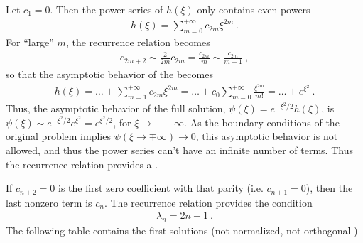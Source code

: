 \documentclass[letterpaper,10pt,english]{jupyterBook}
\begin{document}
\sphinxAtStartPar
{} Let \(c_1 = 0\). Then the power series of \(h(\xi)\) only contains even powers
\begin{equation*}
\begin{split}h(\xi) = \sum_{m=0}^{+\infty} c_{2m} \xi^{2m} \ .\end{split}
\end{equation*}
\sphinxAtStartPar
For “large” \(m\), the recurrence relation becomes
\begin{equation*}
\begin{split}c_{2m+2} \sim \frac{2}{2m} c_{2m} = \frac{c_{2m}}{m} \sim \frac{c_{2m}}{m+1} \ ,\end{split}
\end{equation*}
\sphinxAtStartPar
so that the asymptotic behavior of the  becomes
\begin{equation*}
\begin{split}h(\xi) = \dots + \sum_{m=1}^{+\infty} c_{2m} \xi^{2m} = \dots + c_0 \sum_{m=0}^{+\infty} \frac{\xi^{2m}}{m!} = \dots + e^{\xi^2} \ .\end{split}
\end{equation*}
\sphinxAtStartPar
Thus, the asymptotic behavior of the full solution, \(\psi(\xi) = e^{-\xi^2/2} h(\xi)\), is \(\psi(\xi) \sim e^{-\xi^2/2} e^{\xi^2} = e^{\xi^2/2}\), for \(\xi \rightarrow \mp +\infty\). As the boundary conditions of the original problem implies \(\psi(\xi \rightarrow \mp \infty) \rightarrow 0\), this asymptotic behavior is not allowed, and thus the power series can’t have an infinite number of terms. Thus the recurrence relation provides a .

\sphinxAtStartPar
If \(c_{n+2} = 0\) is the first zero coefficient with that parity (i.e. \(c_{n+1} = 0\)), then the last non\sphinxhyphen{}zero term is \(c_n\). The recurrence relation provides the condition
\begin{equation*}
\begin{split}\lambda_n = 2 n + 1 \ .\end{split}
\end{equation*}
\sphinxAtStartPar
The following table contains the first solutions (not normalized, not orthogonal \sphinxstylestrong{!} )
\end{document}
